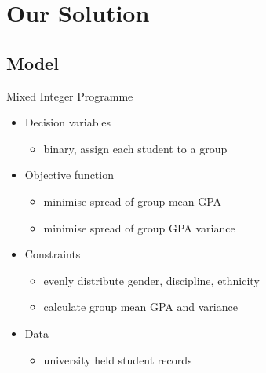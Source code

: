 \documentclass{beamer}
\begin{document}
\section{Our Solution}

\subsection{Model}
\begin{frame}{Mixed Integer Programme}
\begin{itemize}
  \item Decision variables
  \begin{itemize}
    \item binary, assign each student to a group
  \end{itemize}
  \pause
  \item Objective function
  \begin{itemize}
    \item minimise spread of group mean GPA
    \item minimise spread of group GPA variance
  \end{itemize}
  \pause
  \item Constraints
  \begin{itemize}
    \item evenly distribute gender, discipline, ethnicity
    \item calculate group mean GPA and variance
  \end{itemize}
  \pause
  \item Data
    \begin{itemize}
     \item university held student records
    \end{itemize}
\end{itemize}
\end{frame}
\end{document}
